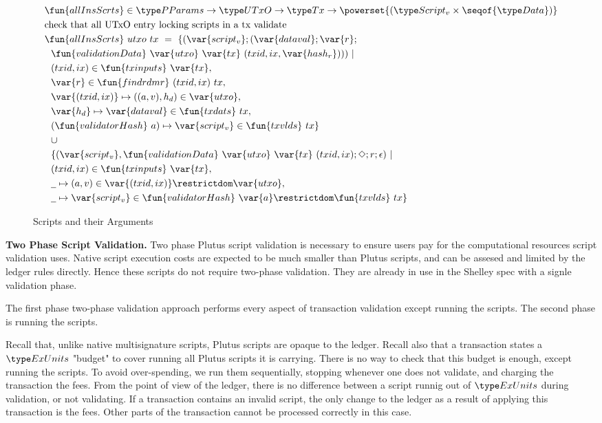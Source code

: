 \begin{figure}[htb]
  \begin{align*}
    & \fun{allInsScrts} \in \PParams \to \UTxO \to \Tx \to \powerset{(\ScriptV\times\seqof{\Data})} \\
    & \text{check that all UTxO entry locking scripts in a tx validate} \\
    & \fun{allInsScrts}~{utxo}~{tx}~=~ \{ (\var{script_v}; (\var{dataval};\var{r}; \\
    & ~~ \fun{validationData}~\var{utxo}~\var{tx}~
      (txid,ix,\var{hash_r}))) ~\vert \\
    & ~~(txid,ix) \in \fun{txinputs}~\var{tx}, \\
    & ~~\var{r} \in \fun{findrdmr}~{(txid,ix)}~{tx}, \\
    & ~~\var{(txid,ix)} \mapsto ((a,v),h_d) \in \var{utxo}, \\
    & ~~\var{h_d} \mapsto \var{dataval} \in \fun{txdats}~{tx}, \\
    & ~~(\fun{validatorHash}~{a})\mapsto \var{script_v}\in \fun{txvlds}~{tx} \}\\
    & ~~\cup~ \\
    & ~~\{ (\var{script_v},\fun{validationData}~\var{utxo}~\var{tx}~
      (txid,ix); \Nothing; r; \epsilon) ~\vert \\
    & ~~(txid,ix) \in \fun{txinputs}~\var{tx}, \\
    & ~~ \wcard \mapsto (a,v) \in \var{(txid,ix)}\restrictdom\var{utxo}, \\
    & ~~\wcard\mapsto \var{script_v}\in
     \fun{validatorHash}~\var{a}\restrictdom\fun{txvlds}~{tx}\}
  \end{align*}
  \caption{Scripts and their Arguments}
  \label{fig:functions:script3}
\end{figure}

\textbf{Two Phase Script Validation.}
Two phase Plutus script validation is necessary to ensure users pay for the
computational resources script validation uses.
Native script execution costs are expected to be much smaller than Plutus
scripts, and can be assesed and limited by the ledger rules directly.
Hence these scripts do not require two-phase validation. They are already
in use in the Shelley spec with a signle validation phase.

The first phase two-phase validation approach
performs every aspect of transaction validation except running the scripts.
The second phase is running the scripts.

Recall that, unlike native
multisignature scripts, Plutus scripts are opaque to the ledger. Recall also
that a transaction states a $\ExUnits$ "budget" to cover running all Plutus
scripts it is carrying. There is no way to check that this budget is enough,
except running the scripts. To avoid over-spending, we run them sequentially,
stopping whenever one does not validate, and charging the transaction the
fees. From the point of view of the ledger, there is no difference
between a script runnig out of $\ExUnits$ during validation, or not validating.
If a transaction contains an invalid script, the only change to the ledger
as a result of applying this transaction is the fees. Other parts of
the transaction cannot be processed correctly in this case.

